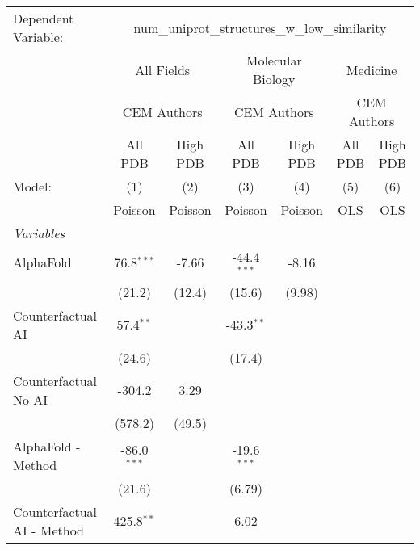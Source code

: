 \begingroup
\centering
\begin{tabular}{lcccccc}
   \tabularnewline \midrule \midrule
   Dependent Variable: & \multicolumn{6}{c}{num\_uniprot\_structures\_w\_low\_similarity}\\
 & \multicolumn{2}{c}{All Fields} & \multicolumn{2}{c}{Molecular Biology} & \multicolumn{2}{c}{Medicine} \\
\cmidrule(lr){2-3} \cmidrule(lr){4-5} \cmidrule(lr){6-7}
 & \multicolumn{2}{c}{CEM Authors} & \multicolumn{2}{c}{CEM Authors} & \multicolumn{2}{c}{CEM Authors} \\
\cmidrule(lr){2-3} \cmidrule(lr){4-5} \cmidrule(lr){6-7}
 & \multicolumn{1}{c}{All PDB} & \multicolumn{1}{c}{High PDB} & \multicolumn{1}{c}{All PDB} & \multicolumn{1}{c}{High PDB} & \multicolumn{1}{c}{All PDB} & \multicolumn{1}{c}{High PDB} \\
\cmidrule(lr){2-2} \cmidrule(lr){3-3} \cmidrule(lr){4-4} \cmidrule(lr){5-5} \cmidrule(lr){6-6} \cmidrule(lr){7-7}
   Model:                        & (1)           & (2)           & (3)           & (4)     & (5)  & (6)\\  
                                 &  Poisson      & Poisson       & Poisson       & Poisson & OLS  & OLS\\  
   \midrule
   \emph{Variables}\\
   AlphaFold                     & 76.8$^{***}$  & -7.66         & -44.4$^{***}$ & -8.16   &      &   \\   
                                 & (21.2)        & (12.4)        & (15.6)        & (9.98)  &      &   \\   
   Counterfactual AI             & 57.4$^{**}$   &               & -43.3$^{**}$  &         &      &   \\   
                                 & (24.6)        &               & (17.4)        &         &      &   \\   
   Counterfactual No AI          & -304.2        & 3.29          &               &         &      &   \\   
                                 & (578.2)       & (49.5)        &               &         &      &   \\   
   AlphaFold - Method            & -86.0$^{***}$ &               & -19.6$^{***}$ &         &      &   \\   
                                 & (21.6)        &               & (6.79)        &         &      &   \\   
   Counterfactual AI - Method    & 425.8$^{**}$  &               & 6.02          &         &      &   \\   

\end{tabular}
